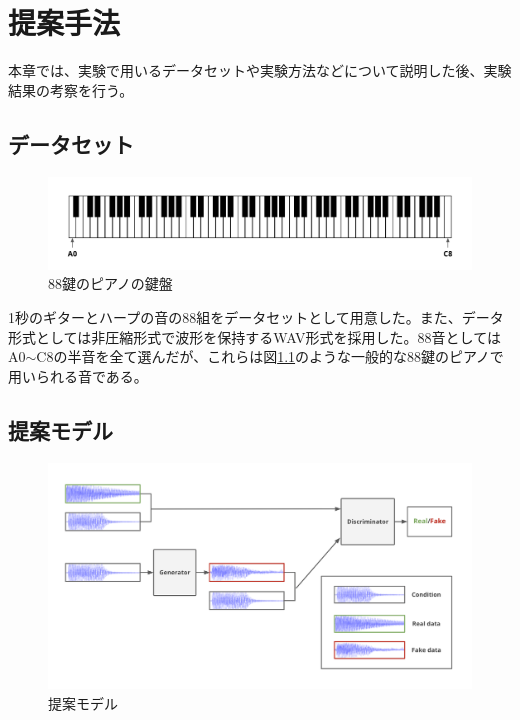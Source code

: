 \chapter{提案手法}

本章では、実験で用いるデータセットや実験方法などについて説明した後、実験結果の考察を行う。

\section{データセット}

\begin{figure}[b]
\begin{center}
\includegraphics[width=\hsize]{figure/piano.png}
\caption{88鍵のピアノの鍵盤}
\label{fig:piano}
\end{center}
\end{figure}

1秒のギターとハープの音の88組をデータセットとして用意した。また、データ形式としては非圧縮形式で波形を保持するWAV形式を採用した。88音としてはA0$\sim$C8の半音を全て選んだが、これらは図\ref{fig:piano}のような一般的な88鍵のピアノで用いられる音である。

\section{提案モデル}

\begin{figure}[b]
\begin{center}
\includegraphics[width=\hsize]{figure/pr_model.png}
\caption{提案モデル}
\label{fig:pr_model}
\end{center}
\end{figure}

